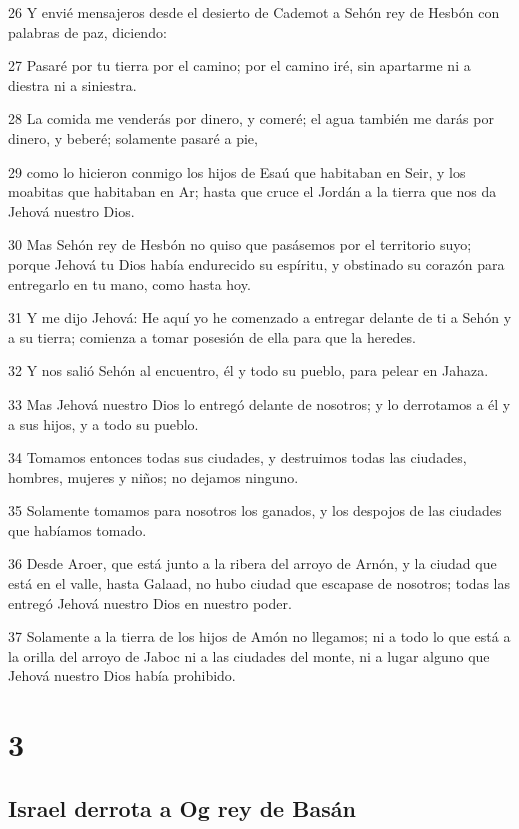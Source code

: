 \par 26 Y envié mensajeros desde el desierto de Cademot a Sehón rey de Hesbón con palabras de paz, diciendo:
\par 27 Pasaré por tu tierra por el camino; por el camino iré, sin apartarme ni a diestra ni a siniestra.
\par 28 La comida me venderás por dinero, y comeré; el agua también me darás por dinero, y beberé; solamente pasaré a pie,
\par 29 como lo hicieron conmigo los hijos de Esaú que habitaban en Seir, y los moabitas que habitaban en Ar; hasta que cruce el Jordán a la tierra que nos da Jehová nuestro Dios.
\par 30 Mas Sehón rey de Hesbón no quiso que pasásemos por el territorio suyo; porque Jehová tu Dios había endurecido su espíritu, y obstinado su corazón para entregarlo en tu mano, como hasta hoy.
\par 31 Y me dijo Jehová: He aquí yo he comenzado a entregar delante de ti a Sehón y a su tierra; comienza a tomar posesión de ella para que la heredes.
\par 32 Y nos salió Sehón al encuentro, él y todo su pueblo, para pelear en Jahaza.
\par 33 Mas Jehová nuestro Dios lo entregó delante de nosotros; y lo derrotamos a él y a sus hijos, y a todo su pueblo.
\par 34 Tomamos entonces todas sus ciudades, y destruimos todas las ciudades, hombres, mujeres y niños; no dejamos ninguno.
\par 35 Solamente tomamos para nosotros los ganados, y los despojos de las ciudades que habíamos tomado.
\par 36 Desde Aroer, que está junto a la ribera del arroyo de Arnón, y la ciudad que está en el valle, hasta Galaad, no hubo ciudad que escapase de nosotros; todas las entregó Jehová nuestro Dios en nuestro poder.
\par 37 Solamente a la tierra de los hijos de Amón no llegamos; ni a todo lo que está a la orilla del arroyo de Jaboc ni a las ciudades del monte, ni a lugar alguno que Jehová nuestro Dios había prohibido.

\chapter{3}

\section{Israel derrota a Og rey de Basán}

